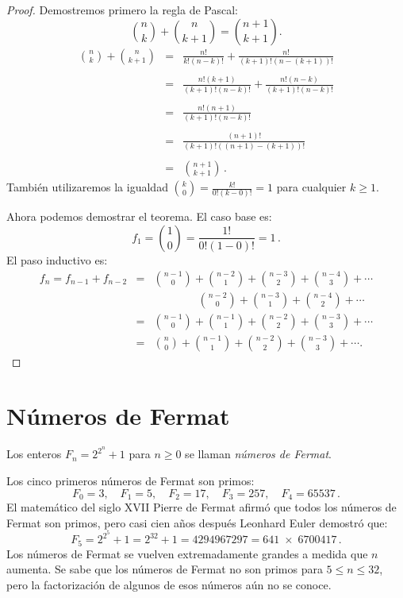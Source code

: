 \begin{proof}
Demostremos primero la regla de Pascal:
\[
\binom{n}{k} + \binom{n}{k+1} = \binom{n+1}{k+1}.
\]
\begin{eqnarray*}
\binom{n}{k} + \binom{n}{k+1} &=& \frac{n!}{k!(n-k)!} + \frac{n!}{(k+1)!(n-(k+1))!}\\
\\
&=&\frac{n!(k+1)}{(k+1)!(n-k)!}+\frac{n!(n-k)}{(k+1)!(n-k)!}\\\\
&=&\frac{n!(n+1)}{(k+1)!(n-k)!}\\\\
&=&\frac{(n+1)!}{(k+1)!((n+1)-(k+1))!}\\\\
&=&\binom{n+1}{k+1}\,.
\end{eqnarray*}
También utilizaremos la igualdad $\displaystyle\binom{k}{0} = \frac{k!}{0!(k-0)!} = 1$ para cualquier $k\geq 1$.

Ahora podemos demostrar el teorema. El caso base es:
\[
f_1 =  \binom{1}{0} = \frac{1!}{0!(1-0)!}=1\,.
\]
El paso inductivo es:
\begin{eqnarray*}
f_n=f_{n-1} + f_{n-2} &=& \binom{n-1}{0} + \binom{n-2}{1} + \binom{n-3}{2} + \binom{n-4}{3} + \cdots\\
&&\quad\quad\quad\quad\binom{n-2}{0} + \binom{n-3}{1} + \binom{n-4}{2} + \cdots\\
&=&\binom{n-1}{0} + \binom{n-1}{1} + \binom{n-2}{2} + \binom{n-3}{3} + \cdots\\
&=&\binom{n}{0} + \binom{n-1}{1} + \binom{n-2}{2} + \binom{n-3}{3} + \cdots.
\end{eqnarray*}
\end{proof}


\section{Números de Fermat}\label{s.induction-fermat}
\begin{definition}
Los enteros $F_n=2^{2^{n}}+1$ para $n\geq 0$ se llaman \emph{números de Fermat}.
\end{definition}

Los cinco primeros números de Fermat son primos:
\[
F_0=3,\quad F_1=5,\quad F_2=17,\quad F_3=257,\quad F_4=65537\,.
\]
El matemático del siglo XVII Pierre de Fermat afirmó que todos los números de Fermat son primos, pero casi cien años después Leonhard Euler demostró que:
\[
F_5=2^{2^5}+1 = 2^{32}+1 = 4294967297 = 641 \;\times\; 6700417\,.
\]
Los números de Fermat se vuelven extremadamente grandes a medida que $n$ aumenta. Se sabe que los números de Fermat no son primos para $5\leq n \leq 32$, pero la factorización de algunos de esos números aún no se conoce.

